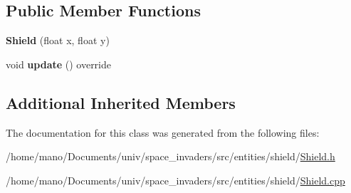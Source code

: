 \subsection*{Public Member Functions}
\begin{DoxyCompactItemize}
\item 
\mbox{\label{classentities_1_1shield_1_1Shield_a2fcfb95c4bca077c3d284538bbdf4559}} 
{\bfseries Shield} (float x, float y)
\item 
\mbox{\label{classentities_1_1shield_1_1Shield_a78b754cf93dea3796d144d9eca664d69}} 
void {\bfseries update} () override
\end{DoxyCompactItemize}
\subsection*{Additional Inherited Members}


The documentation for this class was generated from the following files\+:\begin{DoxyCompactItemize}
\item 
/home/mano/\+Documents/univ/space\+\_\+invaders/src/entities/shield/\hyperlink{Shield_8h}{Shield.\+h}\item 
/home/mano/\+Documents/univ/space\+\_\+invaders/src/entities/shield/\hyperlink{Shield_8cpp}{Shield.\+cpp}\end{DoxyCompactItemize}

